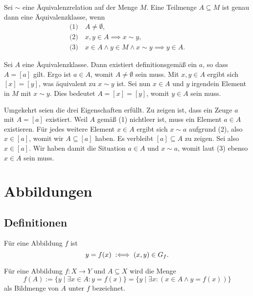 \begin{Satz}\newlinefirst
Sei $\sim$ eine Äquivalenzrelation auf der Menge $M$. Eine
Teilmenge $A\subseteq M$ ist genau dann eine Äquivalenzklasse, wenn%
\begin{gather*}
\text{(1)}\quad A\ne\emptyset,\\
\text{(2)}\quad x,y\in A\implies x\sim y,\\
\text{(3)}\quad x\in A\land y\in M\land x\sim y\implies y\in A.
\end{gather*}
\end{Satz}
\begin{Beweis}
Sei $A$ eine Äquivalenzklasse. Dann existiert definitionsgemäß
ein $a$, so dass $A=[a]$ gilt. Ergo ist $a\in A$, womit
$A\ne\emptyset$ sein muss. Mit $x,y\in A$ ergibt sich $[x]=[y]$,
was äquivalent zu $x\sim y$ ist. Sei nun $x\in A$ und $y$ irgendein
Element in $M$ mit $x\sim y$. Dies bedeutet $A=[x]=[y]$, womit
$y\in A$ sein muss.

Umgekehrt seien die drei Eigenschaften erfüllt. Zu zeigen ist,
dass ein Zeuge $a$ mit $A=[a]$ existiert. Weil $A$ gemäß (1)
nichtleer ist, muss ein Element $a\in A$ existieren. Für jedes
weitere Element $x\in A$ ergibt sich $x\sim a$ aufgrund (2),
also $x\in [a]$, womit wir $A\subseteq [a]$ haben.
Es verbleibt $[a]\subseteq A$ zu zeigen. Sei also $x\in [a]$.
Wir haben damit die Situation $a\in A$ und $x\sim a$, womit
laut (3) ebenso $x\in A$ sein muss.\,\qedsymbol
\end{Beweis}

\newpage
\section{Abbildungen}
\subsection{Definitionen}

\begin{Definition}\label{def:app}
Für eine Abbildung $f$ ist
\[y=f(x)\;:\Longleftrightarrow\; (x,y)\in G_f.\]
\end{Definition}

\begin{Definition}%
\label{def:img}\newlinefirst
Für eine Abbildung $f\colon X\to Y$ und $A\subseteq X$
wird die Menge
\[f(A) := \{y\mid \exists x\in A\colon y=f(x)\}
= \{y\mid \exists x\colon (x\in A\land y=f(x))\}\]
als Bildmenge von $A$ unter $f$ bezeichnet.
\end{Definition}

